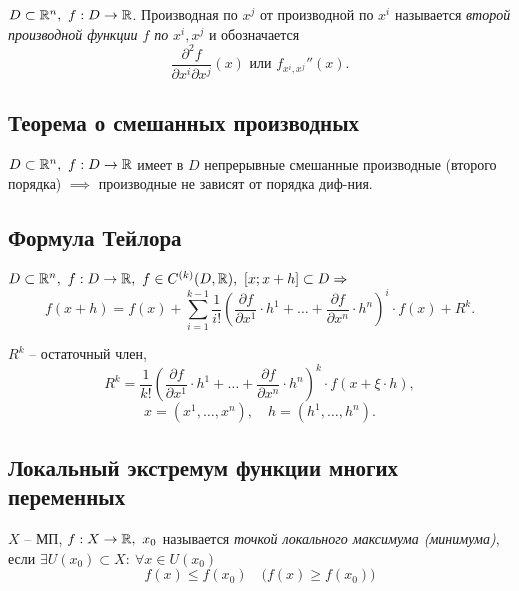 \begin{definition}
    $ D \subset \mathbb{R}^n, \ f:D \rightarrow\mathbb{R} $. Производная по $ x^j $ от производной по $ x^i $ называется \emph{второй производной функции $ f $ по} $ x^i,x^j $ и обозначается
    \[
        \frac{\partial^2f}{\partial x^i\partial x^j}(x)\text{ или }f_{x^i,x^j}''(x).
    \]
\end{definition}

\subsection{Теорема о смешанных производных}

\begin{theorem}
    $ D \subset \mathbb{R}^n, \ f: D \rightarrow\mathbb{R} $ имеет в $ D $ непрерывные смешанные производные (второго порядка) $ \implies $ производные не зависят от порядка диф-ния.
\end{theorem}

\subsection{Формула Тейлора}

\begin{theorem}
    $ D \subset \mathbb{R}^n, \ f:D\rightarrow\mathbb{R}, \ f\in C^{(k)}(D,\mathbb{R}), \ [x;x+h] \subset D \Rightarrow $
    \[
        f(x + h) = f(x) + \sum_{i=1}^{k-1}\frac{1}{i!}\left(\frac{\partial f}{\partial x^1}\cdot h^1 + \ldots + \frac{\partial f}{\partial x^n}\cdot h^n\right)^i \cdot f(x) + R^k.
    \]
\end{theorem}

\begin{note}
    $R^k$ -- остаточный член,
    \[
        R^k = \frac{1}{k!}\left(\frac{\partial f}{\partial x^1}\cdot h^1 + \ldots + \frac{\partial f}{\partial x^n}\cdot h^n\right)^k \cdot f(x + \xi \cdot h),
    \]
    \[
        x = (x^1,\ldots,x^n), \quad h = (h^1,\ldots,h^n).
    \]
\end{note}

\subsection{Локальный экстремум функции многих переменных}

\begin{definition}
    $ X $ -- МП, $ f:X \rightarrow\mathbb{R}, \ x_0 $ называется \emph{точкой локального максимума (минимума)}, если $ \exists U(x_0) \subset X: \ \forall x \in U(x_0) $
    \[
        f(x)\leqslant f(x_0) \quad \big(f(x) \geqslant f(x_0)\big)
    \]
\end{definition}


